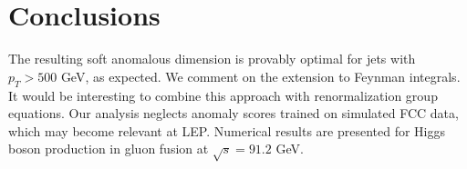 \section{Conclusions}\label{sec:conclusions}

The resulting soft anomalous dimension is provably optimal for jets with
$p_T > 500$ GeV, as expected. We comment on the extension to Feynman
integrals. It would be interesting to combine this approach with
renormalization group equations. Our analysis neglects anomaly scores
trained on simulated FCC data, which may become relevant at LEP.
Numerical results are presented for Higgs boson production in gluon
fusion at $\sqrt{s} = 91.2$ GeV.

